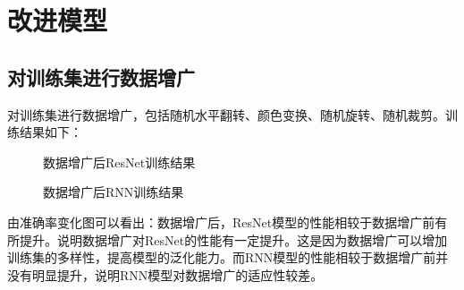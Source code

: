 \documentclass[UTF8,a4paper,12pt]{ctexart}
\begin{document}
\section{改进模型}

\subsection{对训练集进行数据增广}
对训练集进行数据增广，包括随机水平翻转、颜色变换、随机旋转、随机裁剪。训练结果如下：
\begin{figure}[H]
    \centering
    \caption{数据增广后ResNet训练结果}
\end{figure}

\begin{figure}[H]
    \centering
    \caption{数据增广后RNN训练结果}
\end{figure}

由准确率变化图可以看出：数据增广后，ResNet模型的性能相较于数据增广前有所提升。说明数据增广对ResNet的性能有一定提升。这是因为数据增广可以增加训练集的多样性，提高模型的泛化能力。而RNN模型的性能相较于数据增广前并没有明显提升，说明RNN模型对数据增广的适应性较差。



 
\end{document}

